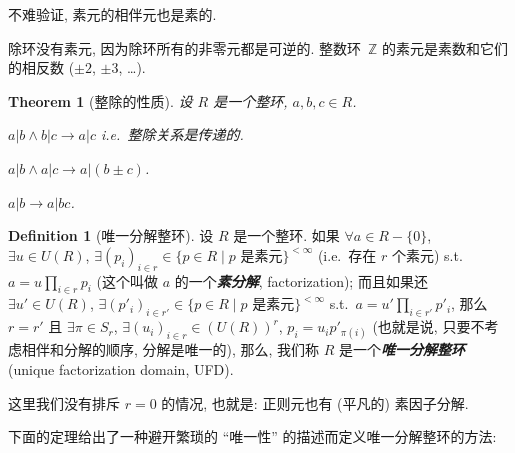 \documentclass[openany]{ctexbook}
\newcommand*{\indexbf}[1]{\emph{\textbf{#1}}\index{#1}} %
\theoremstyle{plain}
\newtheorem{theorem}{Theorem}[section] %
\theoremstyle{definition}
\newtheorem{definition}{Definition}[section] %
\begin{document}
不难验证, 素元的相伴元也是素的.

除环没有素元, 因为除环所有的非零元都是可逆的. 整数环~$\mathbb Z$ 的素元是素数和它们的相反数 ($\pm 2$, $\pm 3$, \ldots). 

\begin{theorem}[整除的性质]
	设 $R$ 是一个整环, $a, b, c \in R$.
	\begin{conditionlist}
		\item $a | b \wedge b | c \to a | c$ i.e.\ 整除关系是传递的.
		\item $a | b \wedge a | c \to a | (b \pm c)$.
		\item $a | b \to a | bc$.
	\end{conditionlist}
\end{theorem}

\begin{definition}[唯一分解整环]
	设 $R$ 是一个整环.
	如果 $\forall a \in R - \{0\}$, $\exists u \in U(R)$, $\exists (p_i)_{i \in r} \in \{p \in R \mid \text{$p$ 是素元}\}^{< \infty}$ (i.e.\ 存在 $r$ 个素元) s.t.\ $a = u \prod_{i \in r} p_i$ (这个叫做 $a$ 的一个\indexbf{素分解}, factorization);
	而且如果还 $\exists u' \in U(R)$, $\exists (p'_i)_{i \in r'} \in \{p \in R \mid \text{$p$ 是素元}\}^{< \infty}$ s.t.\ $a = u' \prod_{i \in r'} p'_i$, 
	那么 $r = r'$ 且 $\exists \pi \in S_r$, $\exists (u_i)_{i \in r} \in (U(R))^r$, $p_i = u_i p'_{\pi(i)}$ (也就是说, 只要不考虑相伴和分解的顺序, 分解是唯一的), 
	那么, 我们称 $R$ 是一个\indexbf{唯一分解整环} (unique factorization domain, UFD).
\end{definition}

这里我们没有排斥 $r = 0$ 的情况, 也就是: 正则元也有 (平凡的) 素因子分解.

下面的定理给出了一种避开繁琐的 ``唯一性'' 的描述而定义唯一分解整环的方法:
\end{document}
